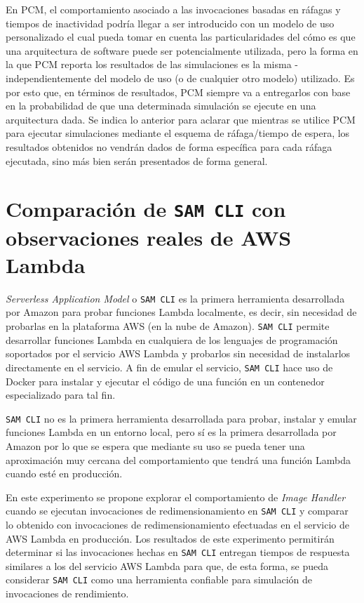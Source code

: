 En PCM, el comportamiento asociado a las invocaciones basadas en ráfagas y tiempos de inactividad podría llegar a ser introducido con un modelo de uso personalizado el cual pueda tomar en cuenta las particularidades del cómo es que una arquitectura de software puede ser potencialmente utilizada, pero la forma en la que PCM reporta los resultados de las simulaciones es la misma - independientemente del modelo de uso (o de cualquier otro modelo) utilizado. Es por esto que, en términos de resultados, PCM siempre va a entregarlos con base en la probabilidad de que una determinada simulación se ejecute en una arquitectura dada. Se indica lo anterior para aclarar que mientras se utilice PCM para ejecutar simulaciones mediante el esquema de ráfaga/tiempo de espera, los resultados obtenidos no vendrán dados de forma específica para cada ráfaga ejecutada, sino más bien serán presentados de forma general.

\section{Comparación de \texttt{SAM CLI} con observaciones reales de AWS Lambda}\label{sec:experimento-4} 
\emph{Serverless Application Model} o \texttt{SAM CLI} es la primera herramienta desarrollada por Amazon para probar funciones Lambda localmente, es decir, sin necesidad de probarlas en la plataforma AWS (en la nube de Amazon). \texttt{SAM CLI} permite desarrollar funciones Lambda en cualquiera de los lenguajes de programación soportados por el servicio AWS Lambda y probarlos sin necesidad de instalarlos directamente en el servicio. A fin de emular el servicio, \texttt{SAM CLI} hace uso de Docker para instalar y ejecutar el código de una función en un contenedor especializado para tal fin. 

\texttt{SAM CLI} no es la primera herramienta desarrollada para probar, instalar y emular funciones Lambda en un entorno local, pero sí es la primera desarrollada por Amazon por lo que se espera que mediante su uso se pueda tener una aproximación muy cercana del comportamiento que tendrá una función Lambda cuando esté en producción.

En este experimento se propone explorar el comportamiento de \emph{Image Handler} cuando se ejecutan invocaciones de redimensionamiento en \texttt{SAM CLI} y comparar lo obtenido con invocaciones de redimensionamiento efectuadas en el servicio de AWS Lambda en producción. Los resultados de este experimento permitirán determinar si las invocaciones hechas en \texttt{SAM CLI} entregan tiempos de respuesta similares a los del servicio AWS Lambda para que, de esta forma, se pueda considerar \texttt{SAM CLI} como una herramienta confiable para simulación de invocaciones de rendimiento.

